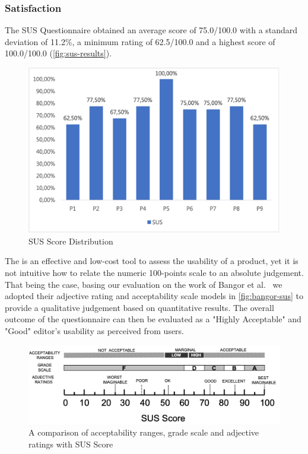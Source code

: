 \subsubsection*{Satisfaction}
The \gls{SUS} Questionnaire obtained an average score of 75.0/100.0 with a standard deviation of 11.2\%, a minimum rating of 62.5/100.0 and a highest score of 100.0/100.0 (\autoref{fig:sus-results}).
\begin{figure}[h]
    \centering
    \includegraphics{Figures/Evaluation/results/sus.png}
    \caption{SUS Score Distribution}
    \label{fig:sus-results}
\end{figure}

The  is an effective and low-cost tool to assess the usability of a product, yet it is not intuitive how to relate the numeric 100-points scale to an absolute judgement. That being the case, basing our evaluation on the work of Bangor et al.~\cite{bangor_determining_2009} we adopted their adjective rating and acceptability scale models in \autoref{fig:bangor-sus} to provide a qualitative judgement based on quantitative results. The overall outcome of the questionnaire can then be evaluated as a "Highly Acceptable" and "Good" editor's usability as perceived from users.

\begin{figure}[h]
    \centering
    \includegraphics[width=\linewidth]{Figures/Evaluation/results/bangor-sus.png}
    \caption{A comparison of acceptability ranges, grade scale and adjective ratings with SUS Score \cite{bangor_determining_2009}}
    \label{fig:bangor-sus}
\end{figure}

